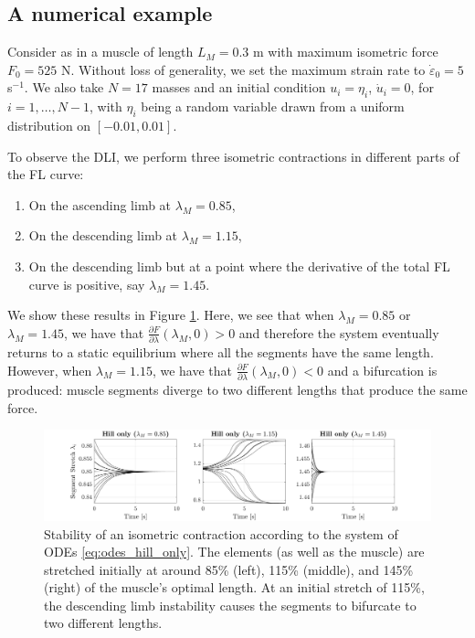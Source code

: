 \documentclass{sfuthesis}
\numberwithin{equation}{section}
\numberwithin{figure}{chapter}
\numberwithin{table}{chapter}
\theoremstyle{definition}
\newcommand{\depsilon}{\dot{\varepsilon}}
\begin{document}
\subsection{A numerical example} \label{sec:stability_numerical_experiment}

Consider as in \cite{YeoEtAl2023NumericalInstability} a muscle of length $L_M = 0.3$ m with maximum isometric force $F_0 = 525 $ N. Without loss of generality, we set the maximum strain rate to $\depsilon_0 = 5$ s$^{-1}$. We also take $N=17$ masses and an initial condition $u_i = \eta_i$, $\dot{u}_i = 0$, for $i=1,\dots,N-1$, with $\eta_i$ being a random variable drawn from a uniform distribution on $[-0.01, 0.01]$.

To observe the DLI, we perform three isometric contractions in different parts of the FL curve:
\begin{enumerate}
    \item On the ascending limb at $\lambda_M = 0.85$,
    \item On the descending limb at $\lambda_M = 1.15$,
    \item On the descending limb but at a point where the derivative of the total FL curve is positive, say $\lambda_M  = 1.45$.
\end{enumerate}
We show these results in Figure \ref{fig:hill_only_unstable}. Here, we see that when $\lambda_M = 0.85$ or $\lambda_M = 1.45$, we have that $\frac{\partial F}{\partial \lambda}(\lambda_M, 0) > 0$ and therefore the system eventually returns to a static equilibrium where all the segments have the same length. However, when $\lambda_M = 1.15$, we have that $\frac{\partial F}{\partial \lambda}(\lambda_M, 0) < 0$ and a bifurcation is produced: muscle segments diverge to two different lengths that produce the same force.

\begin{figure}
    \centering
    \includegraphics[width=\textwidth]{05_no_bm_unstable.png}
    \caption{Stability of an isometric contraction according to the system of ODEs \eqref{eq:odes_hill_only}. The elements (as well as the muscle) are stretched initially at around 85\% (left), 115\% (middle), and 145\% (right) of the muscle's optimal length. At an initial stretch of 115\%, the descending limb instability causes the segments to bifurcate to two different lengths.}
    \label{fig:hill_only_unstable}
\end{figure}
\end{document}
